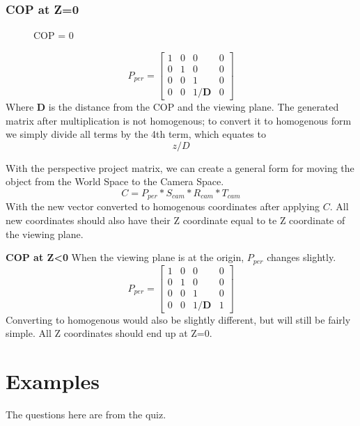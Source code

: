 \subsubsection{COP at Z=0}
\begin{figure}[!htb]
	\caption{\label{fig:trianglesZ0} COP = 0}
\end{figure}
\begin{equation}
\label{eqn:proj0}
P_{per} = \begin{bmatrix}
1 & 0 & 0 & 0\\ 
0 & 1 & 0 & 0\\ 
0 & 0 & 1 & 0\\
0 & 0 & 1/\mathbf{D} & 0 
\end{bmatrix}
\end{equation}
Where \textbf{D} is the distance from the COP and the viewing plane. The generated matrix after multiplication is not homogenous; to convert it to homogenous form we simply divide all terms by the 4th term, which equates to \[z/D\]

With the perspective project matrix, we can create a general form for moving the object from the World Space to the Camera Space.
\begin{equation}
\label{eqn:worldToCam1}
C = P_{per} * S_{cam} * R_{cam} * T_{cam}
\end{equation}
With the new vector converted to homogenous coordinates after applying $C$.
All new coordinates should also have their Z coordinate equal to te Z coordinate of the viewing plane.

\textbf{COP at Z<0}
When the viewing plane is at the origin, $P_{per}$ changes slightly.
\begin{equation}
\label{eqn:proj1}
P_{per} = \begin{bmatrix}
1 & 0 & 0 & 0\\ 
0 & 1 & 0 & 0\\ 
0 & 0 & 1 & 0\\
0 & 0 & 1/\mathbf{D} & 1 
\end{bmatrix}
\end{equation}
Converting to homogenous would also be slightly different, but will still be fairly simple.
All Z coordinates should end up at Z=0.

\section{Examples}

The questions here are from the quiz.

